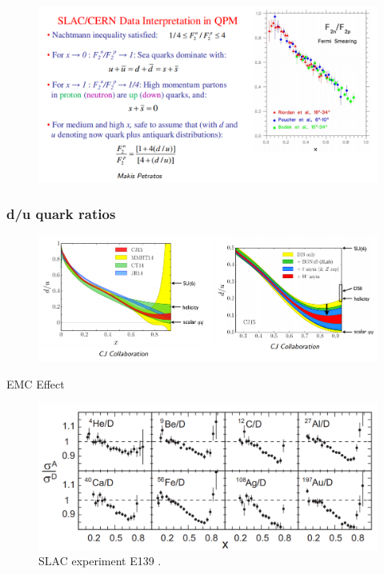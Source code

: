 \documentclass{beamer}
\begin{document}
\begin{frame}

\vspace{-15pt}

	\begin{figure}
		\includegraphics[width =12.5cm]{../images/slac_cern_inter.png}
	\end{figure}

\end{frame}


\begin{frame}
\frametitle{d/u quark ratios}
\vspace{-15pt}

\begin{figure}
	\includegraphics[width =12.5cm]{../images/d_u_plots.png}
\end{figure}

\end{frame}
\begin{frame}{EMC Effect}

\begin{figure}
	\caption{\label{EMC_slac} SLAC experiment E139 .}
	\includegraphics[width =12cm]{../images/EMC_slac_horiz.png}
\end{figure}


\end{frame}
\end{document}
